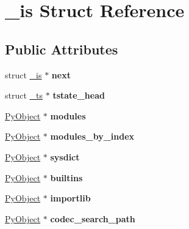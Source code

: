 \hypertarget{struct__is}{}\section{\+\_\+is Struct Reference}
\label{struct__is}
\subsection*{Public Attributes}
\begin{DoxyCompactItemize}
\item 
struct \hyperlink{struct__is}{\+\_\+is} $\ast$ {\bfseries next}\hypertarget{struct__is_a1c3d238e47f3b06f3dcc161e18145e4a}{}\label{struct__is_a1c3d238e47f3b06f3dcc161e18145e4a}

\item 
struct \hyperlink{struct__ts}{\+\_\+ts} $\ast$ {\bfseries tstate\+\_\+head}\hypertarget{struct__is_a0691d58c38c8286ac6dbceb6aa98bd09}{}\label{struct__is_a0691d58c38c8286ac6dbceb6aa98bd09}

\item 
\hyperlink{struct__object}{Py\+Object} $\ast$ {\bfseries modules}\hypertarget{struct__is_a7f06027c7ab7541936413d7d91eac5fb}{}\label{struct__is_a7f06027c7ab7541936413d7d91eac5fb}

\item 
\hyperlink{struct__object}{Py\+Object} $\ast$ {\bfseries modules\+\_\+by\+\_\+index}\hypertarget{struct__is_a1431ac8b548820109cc56eaa266e69b4}{}\label{struct__is_a1431ac8b548820109cc56eaa266e69b4}

\item 
\hyperlink{struct__object}{Py\+Object} $\ast$ {\bfseries sysdict}\hypertarget{struct__is_a95556056d8c72409c77f50896b610110}{}\label{struct__is_a95556056d8c72409c77f50896b610110}

\item 
\hyperlink{struct__object}{Py\+Object} $\ast$ {\bfseries builtins}\hypertarget{struct__is_aed5b927da76a3c44b320b5faf68db0f5}{}\label{struct__is_aed5b927da76a3c44b320b5faf68db0f5}

\item 
\hyperlink{struct__object}{Py\+Object} $\ast$ {\bfseries importlib}\hypertarget{struct__is_ab9fbc89270858fe958ccea121e615fd6}{}\label{struct__is_ab9fbc89270858fe958ccea121e615fd6}

\item 
\hyperlink{struct__object}{Py\+Object} $\ast$ {\bfseries codec\+\_\+search\+\_\+path}\hypertarget{struct__is_ac1d3848054d54f616334ffc47b560fad}{}\label{struct__is_ac1d3848054d54f616334ffc47b560fad}


\end{DoxyCompactItemize}
